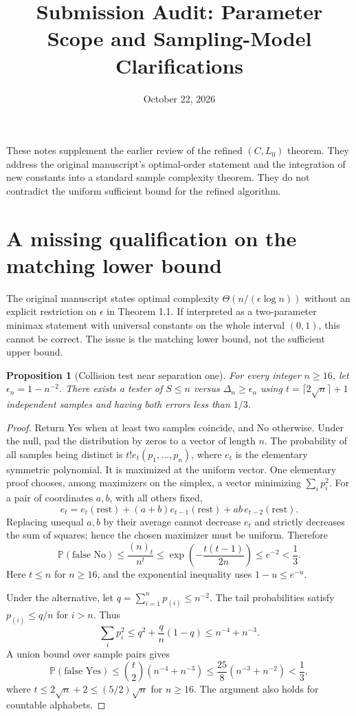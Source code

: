 \documentclass[11pt]{article}
\title{Submission Audit: Parameter Scope and Sampling-Model Clarifications}
\author{}\date{October 22, 2026}
\newtheorem{proposition}{Proposition}
\newcommand{\Prb}{\mathbb P}
\begin{document}
\maketitle
\noindent These notes supplement the earlier review of the refined
$(C,L_0)$ theorem. They address the original manuscript's optimal-order
statement and the integration of new constants into a standard sample
complexity theorem. They do not contradict the uniform sufficient bound
for the refined algorithm.

\section{A missing qualification on the matching lower bound}
The original manuscript states optimal complexity
$\Theta(n/(\epsilon\log n))$ without an explicit restriction on $\epsilon$
in Theorem 1.1. If interpreted as a two-parameter minimax statement with
universal constants on the whole interval $(0,1)$, this cannot be correct.
The issue is the matching lower bound, not the sufficient upper bound.

\begin{proposition}[Collision test near separation one]
For every integer $n\ge16$, let $\epsilon_n=1-n^{-2}$. There exists a
tester of $S\le n$ versus $\Delta_n\ge\epsilon_n$ using
$t=\lceil2\sqrt n\rceil+1$ independent samples and having both errors
less than $1/3$.
\end{proposition}
\begin{proof}
Return Yes when at least two samples coincide, and No otherwise.
Under the null, pad the distribution by zeros to a vector of length $n$.
The probability of all samples being distinct is $t!e_t(p_1,\ldots,p_n)$,
where $e_t$ is the elementary symmetric polynomial. It is maximized at
the uniform vector. One elementary proof chooses, among maximizers on
the simplex, a vector minimizing $\sum_i p_i^2$. For a pair of coordinates
$a,b$, with all others fixed,
\[
e_t=e_t(\mathrm{rest})+(a+b)e_{t-1}(\mathrm{rest})
                     +ab\,e_{t-2}(\mathrm{rest}).
\]
Replacing unequal $a,b$ by their average cannot decrease $e_t$ and strictly
decreases the sum of squares; hence the chosen maximizer must be uniform.
Therefore
\[
\Prb(\text{false No})\le \frac{(n)_t}{n^t}
\le \exp\left(-\frac{t(t-1)}{2n}\right)\le e^{-2}<\frac13.
\]
Here $t\le n$ for $n\ge16$, and the exponential inequality uses
$1-u\le e^{-u}$.

Under the alternative, let $q=\sum_{i=1}^n p_{(i)}\le n^{-2}$.
The tail probabilities satisfy $p_{(i)}\le q/n$ for $i>n$. Thus
\[
\sum_i p_i^2
\le q^2+\frac qn(1-q)
\le n^{-4}+n^{-3}.
\]
A union bound over sample pairs gives
\[
\Prb(\text{false Yes})\le {t\choose2}(n^{-4}+n^{-3})
\le\frac{25}{8}(n^{-3}+n^{-2})<\frac13,
\]
where $t\le2\sqrt n+2\le(5/2)\sqrt n$ for $n\ge16$.
The argument also holds for countable alphabets.
\end{proof}
\end{document}
